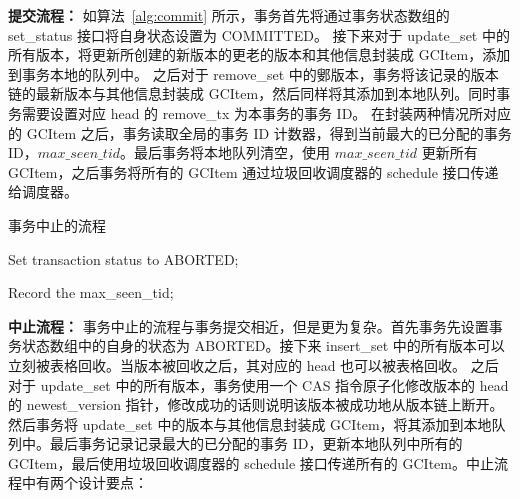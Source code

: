 \textbf{提交流程：} 如算法~\ref{alg:commit} 所示，事务首先将通过事务状态数组的 set\_status 接口将自身状态设置为 COMMITTED。
接下来对于 update\_set 中的所有版本，将更新所创建的新版本的更老的版本和其他信息封装成 GCItem，添加到事务本地的队列中。
之后对于 remove\_set 中的鄋版本，事务将该记录的版本链的最新版本与其他信息封装成 GCItem，然后同样将其添加到本地队列。同时事务需要设置对应 head 的 remove\_tx 为本事务的事务 ID。
在封装两种情况所对应的 GCItem 之后，事务读取全局的事务 ID 计数器，得到当前最大的已分配的事务 ID，$max\_seen\_tid$。最后事务将本地队列清空，使用 $max\_seen\_tid$ 更新所有 GCItem，之后事务将所有的 GCItem 通过垃圾回收调度器的 schedule 接口传递给调度器。


\begin{algorithm}[h]
    \caption{事务中止的流程}
    \label{alg:abort}
    \BlankLine
    Set transaction status to ABORTED;



    Record the max\_seen\_tid;



\end{algorithm}

\textbf{中止流程：} 事务中止的流程与事务提交相近，但是更为复杂。首先事务先设置事务状态数组中的自身的状态为 ABORTED。接下来 insert\_set 中的所有版本可以立刻被表格回收。当版本被回收之后，其对应的 head 也可以被表格回收。
之后对于 update\_set 中的所有版本，事务使用一个 CAS 指令原子化修改版本的 head 的 newest\_version 指针，修改成功的话则说明该版本被成功地从版本链上断开。然后事务将 update\_set 中的版本与其他信息封装成 GCItem，将其添加到本地队列中。最后事务记录记录最大的已分配的事务 ID，更新本地队列中所有的 GCItem，最后使用垃圾回收调度器的 schedule 接口传递所有的 GCItem。中止流程中有两个设计要点：


